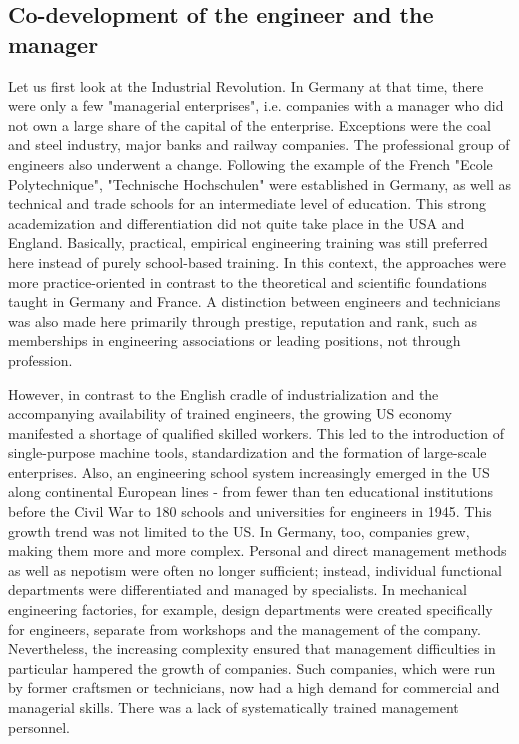 \documentclass[a4paper,12pt]{scrartcl}
\begin{document}
\subsection{Co-development of the engineer and the manager}
Let us first look at the Industrial Revolution. In Germany at that time, there were only a few "managerial enterprises", i.e. companies with a manager who did not own a large share of the capital of the enterprise. Exceptions were the coal and steel industry, major banks and railway companies. The professional group of engineers also underwent a change. Following the example of the French "Ecole Polytechnique", "Technische Hochschulen" were established in Germany, as well as technical and trade schools for an intermediate level of education.\cite{kaiser:2006} This strong academization and differentiation did not quite take place in the USA and England. Basically, practical, empirical engineering training was still preferred here instead of purely school-based training. In this context, the approaches were more practice-oriented in contrast to the theoretical and scientific foundations taught in Germany and France. A distinction between engineers and technicians was also made here primarily through prestige, reputation and rank, such as memberships in engineering associations or leading positions, not through profession.

However, in contrast to the English cradle of industrialization and the accompanying availability of trained engineers, the growing US economy manifested a shortage of qualified skilled workers. This led to the introduction of single-purpose machine tools, standardization and the formation of large-scale enterprises. Also, an engineering school system increasingly emerged in the US along continental European lines - from fewer than ten educational institutions before the Civil War to 180 schools and universities for engineers in 1945.\cite{gispen:2006}
This growth trend was not limited to the US. In Germany, too, companies grew, making them more and more complex. Personal and direct management methods as well as nepotism were often no longer sufficient; instead, individual functional departments were differentiated and managed by specialists. In mechanical engineering factories, for example, design departments were created specifically for engineers, separate from workshops and the management of the company. Nevertheless, the increasing complexity ensured that management difficulties in particular hampered the growth of companies. Such companies, which were run by former craftsmen or technicians, now had a high demand for commercial and managerial skills. There was a lack of systematically trained management personnel.\cite{kocka:1999}
\end{document}

